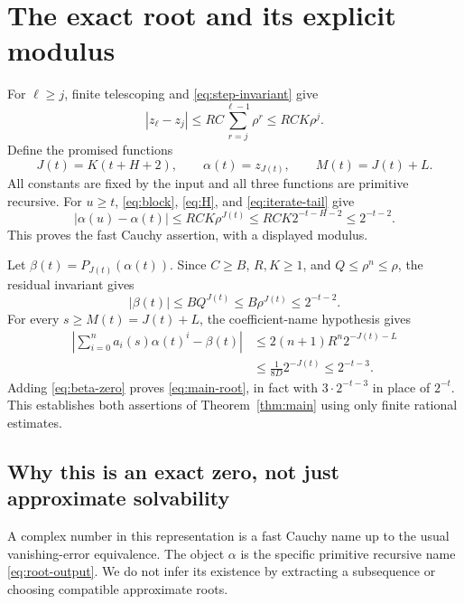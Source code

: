 \documentclass[11pt,letterpaper]{article}
\theoremstyle{definition}\newtheorem{definition}[theorem]{Definition}
\theoremstyle{remark}\newtheorem{remark}[theorem]{Remark}
\begin{document}
\section{The exact root and its explicit modulus}
\label{sec:root}

For $\ell\ge j$, finite telescoping and \eqref{eq:step-invariant} give
\begin{equation}
 |z_\ell-z_j|\le RC\sum_{r=j}^{\ell-1}\rho^r
                         \le RCK\rho^j.
 \label{eq:iterate-tail}
\end{equation}
Define the promised functions
\begin{equation}
 J(t)=K(t+H+2),\qquad
 \alpha(t)=z_{J(t)},\qquad M(t)=J(t)+L.
 \label{eq:root-output}
\end{equation}
All constants are fixed by the input and all three functions are primitive
recursive. For $u\ge t$, \eqref{eq:block}, \eqref{eq:H}, and
\eqref{eq:iterate-tail} give
\begin{equation}
 |\alpha(u)-\alpha(t)|\le RCK\rho^{J(t)}
      \le RCK2^{-t-H-2}\le2^{-t-2}.
 \label{eq:root-cauchy}
\end{equation}
This proves the fast Cauchy assertion, with a displayed modulus.

Let $\beta(t)=P_{J(t)}(\alpha(t))$. Since $C\ge B$, $R,K\ge1$, and
$Q\le\rho^n\le\rho$, the residual invariant gives
\begin{equation}
 |\beta(t)|\le BQ^{J(t)}
     \le B\rho^{J(t)}\le2^{-t-2}.
 \label{eq:beta-zero}
\end{equation}
For every $s\ge M(t)=J(t)+L$, the coefficient-name hypothesis gives
\begin{align*}
 \left|\sum_{i=0}^n a_i(s)\alpha(t)^i-\beta(t)\right|
 &\le2(n+1)R^n2^{-J(t)-L}\\
 &\le\frac1{8D}2^{-J(t)}\le2^{-t-3}.
\end{align*}
Adding \eqref{eq:beta-zero} proves \eqref{eq:main-root}, in fact with
$3\cdot2^{-t-3}$ in place of $2^{-t}$. This establishes both assertions of
Theorem~\ref{thm:main} using only finite rational estimates.

\subsection{Why this is an exact zero, not just approximate solvability}

A complex number in this representation is a fast Cauchy name up to the
usual vanishing-error equivalence. The object $\alpha$ is the specific
primitive recursive name \eqref{eq:root-output}. We do not infer its
existence by extracting a subsequence or choosing compatible approximate
roots.
\end{document}
